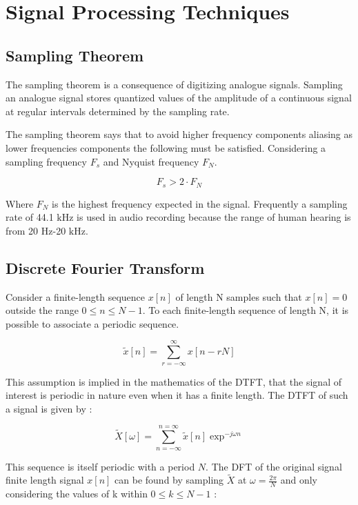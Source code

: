 \section{Signal Processing Techniques}
\subsection{Sampling Theorem}

The sampling theorem is a consequence of digitizing analogue signals. Sampling
an analogue signal stores quantized values of the amplitude of a continuous
signal at regular intervals determined by the sampling rate.

The sampling theorem says that to avoid higher frequency components aliasing as
lower frequencies components the following must be satisfied. Considering a
sampling frequency $F_{s}$ and Nyquist frequency $F_{N}$.

\begin{equation}
  F_{s} > 2\cdot F_{N}
\end{equation}

Where $F_{N}$ is the highest frequency expected in the signal. Frequently a sampling
rate of 44.1 $\si{\kilo\hertz}$ is used in audio recording because the range of
human hearing is from 20 $\si{\hertz}$-20 $\si{\kilo\hertz}$.

\subsection{Discrete Fourier Transform}

Consider a finite-length sequence $x[n]$ of length N samples such that $x[n] =
  0$ outside the range $0 \leq  n \leq N - 1$. To each finite-length sequence of
length N, it is possible to associate a periodic sequence.

\begin{equation}
  \tilde{x}[n] =\sum_{r=-\infty}^{\infty} x[n-r N]
\end{equation}

This assumption is implied in the mathematics of the \ac{DTFT}, that the signal of interest is
periodic in nature even when it has a finite length. The \ac{DTFT} of such a signal is given by :

\begin{equation}
  \tilde{X}[\omega] =\sum_{n=-\infty}^{n=\infty} \tilde{x}[n] \exp^{-j \omega n }
\end{equation}

This sequence is itself periodic with a period $N$. The \ac{DFT} of the original signal finite length signal $x[n]$ can be found
by sampling $\tilde{X}$ at $\omega=\frac{2 \pi}{N}$ and only considering the
values of k within $0 \leq  k \leq N - 1$ :

